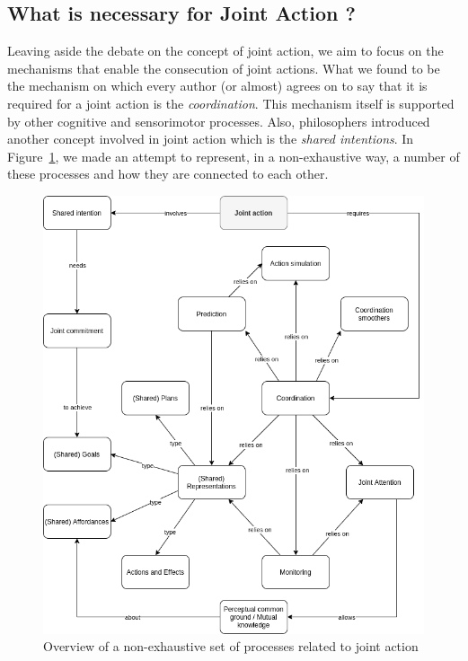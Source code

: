 \documentclass[a4paper,11pt,twoside]{StyleThese}
\begin{document}
\subsection{What is necessary for Joint Action ?}\label{subsec:necess_ja}

Leaving aside the debate on the concept of joint action, we aim to focus on the mechanisms that enable the consecution of joint actions. What we found to be the mechanism on which every author (or almost) agrees on to say that it is required for a joint action is the \textit{coordination}. This mechanism itself is supported by other cognitive and sensorimotor processes. Also, philosophers introduced another concept involved in joint action which is the \textit{shared intentions}. In Figure~\ref{fig:chap1:ja}, we made an attempt to represent, in a non-exhaustive way, a number of these processes and how they are connected to each other.

 \begin{figure}[!ht]
	\includegraphics[width=\linewidth]{figures/chapter1/joint_action.png}
	\caption{Overview of a non-exhaustive set of processes related to joint action}
	\label{fig:chap1:ja}
\end{figure}
\end{document}
